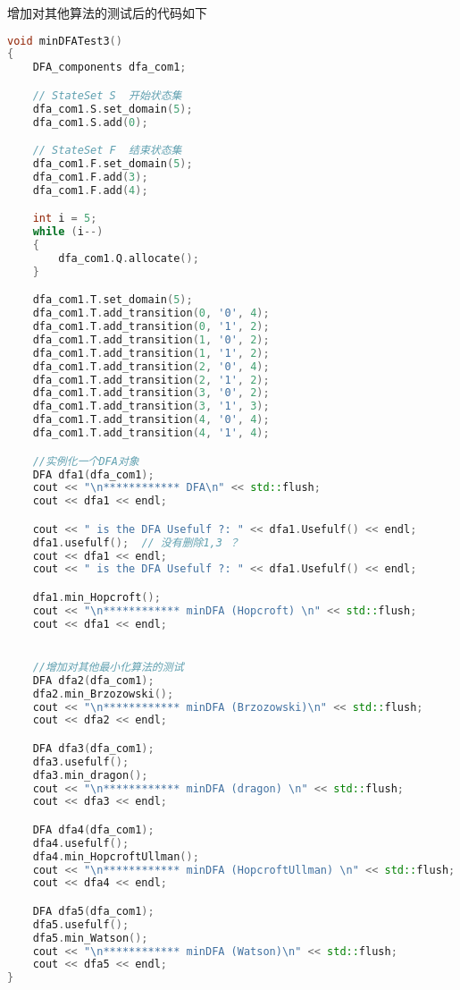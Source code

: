 增加对其他算法的测试后的代码如下
\begin{lstlisting}[language=C++,label={lst:a-sample-addtion},caption={}]
void minDFATest3()
{
	DFA_components dfa_com1;

	// StateSet S  开始状态集
	dfa_com1.S.set_domain(5);
	dfa_com1.S.add(0);

	// StateSet F  结束状态集
	dfa_com1.F.set_domain(5);
	dfa_com1.F.add(3);
	dfa_com1.F.add(4);

	int i = 5;
	while (i--)
	{
		dfa_com1.Q.allocate();
	}

	dfa_com1.T.set_domain(5);
	dfa_com1.T.add_transition(0, '0', 4);
	dfa_com1.T.add_transition(0, '1', 2);
	dfa_com1.T.add_transition(1, '0', 2);
	dfa_com1.T.add_transition(1, '1', 2);
	dfa_com1.T.add_transition(2, '0', 4);
	dfa_com1.T.add_transition(2, '1', 2);
	dfa_com1.T.add_transition(3, '0', 2);
	dfa_com1.T.add_transition(3, '1', 3);
	dfa_com1.T.add_transition(4, '0', 4);
	dfa_com1.T.add_transition(4, '1', 4);

	//实例化一个DFA对象
	DFA dfa1(dfa_com1);
	cout << "\n************ DFA\n" << std::flush;
	cout << dfa1 << endl;

	cout << " is the DFA Usefulf ?: " << dfa1.Usefulf() << endl;
	dfa1.usefulf();  // 没有删除1,3 ？
	cout << dfa1 << endl;
	cout << " is the DFA Usefulf ?: " << dfa1.Usefulf() << endl;

	dfa1.min_Hopcroft();
	cout << "\n************ minDFA (Hopcroft) \n" << std::flush;
	cout << dfa1 << endl;


	//增加对其他最小化算法的测试
	DFA dfa2(dfa_com1);
	dfa2.min_Brzozowski();
	cout << "\n************ minDFA (Brzozowski)\n" << std::flush;
	cout << dfa2 << endl;

	DFA dfa3(dfa_com1);
	dfa3.usefulf();
	dfa3.min_dragon();
	cout << "\n************ minDFA (dragon) \n" << std::flush;
	cout << dfa3 << endl;

	DFA dfa4(dfa_com1);
	dfa4.usefulf();
	dfa4.min_HopcroftUllman();
	cout << "\n************ minDFA (HopcroftUllman) \n" << std::flush;
	cout << dfa4 << endl;

	DFA dfa5(dfa_com1);
	dfa5.usefulf();
	dfa5.min_Watson();
	cout << "\n************ minDFA (Watson)\n" << std::flush;
	cout << dfa5 << endl;
}
\end{lstlisting}